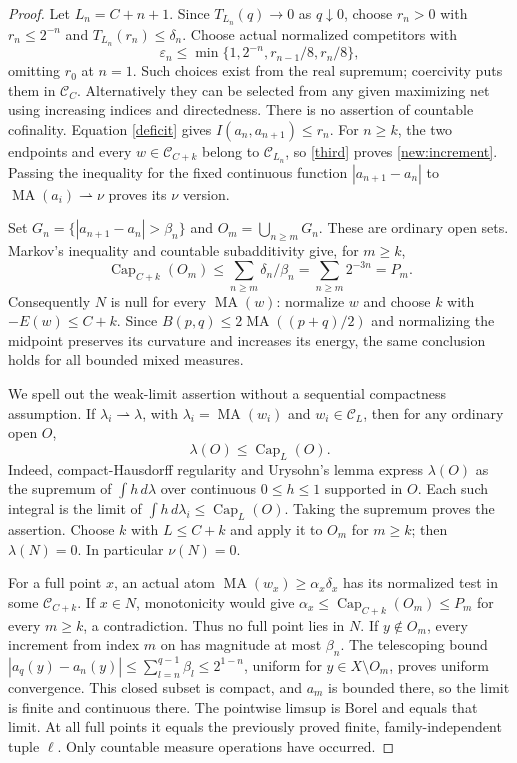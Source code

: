 \documentclass[11pt]{article}
\newcommand{\MA}{\operatorname{MA}}
\newcommand{\C}{\mathcal C}
\begin{document}
\begin{proof}
Let $L_n=C+n+1$. Since $T_{L_n}(q)\to0$ as $q\downarrow0$, choose
$r_n>0$ with $r_n\le2^{-n}$ and $T_{L_n}(r_n)\le\delta_n$.
Choose actual normalized competitors with
\[
 \varepsilon_n\le\min\{1,2^{-n},r_{n-1}/8,r_n/8\},
\]
omitting $r_0$ at $n=1$. Such choices exist from the real supremum;
coercivity puts them in $\C_C$. Alternatively they can be selected
from any given maximizing net using increasing indices and directedness.
There is no assertion of countable cofinality. Equation \eqref{deficit}
gives $I(a_n,a_{n+1})\le r_n$. For $n\ge k$, the two endpoints and
every $w\in\C_{C+k}$ belong to $\C_{L_n}$, so \eqref{third} proves
\eqref{new:increment}. Passing the inequality for the fixed continuous
function $|a_{n+1}-a_n|$ to $\MA(a_i)\rightharpoonup\nu$ proves its
$\nu$ version.

Set $G_n=\{|a_{n+1}-a_n|>\beta_n\}$ and
$O_m=\bigcup_{n\ge m}G_n$. These are ordinary open sets. Markov's
inequality and countable subadditivity give, for $m\ge k$,
\[
 \operatorname{Cap}_{C+k}(O_m)
 \le\sum_{n\ge m}\delta_n/\beta_n
 =\sum_{n\ge m}2^{-3n}=P_m.
\]
Consequently $N$ is null for every $\MA(w)$: normalize $w$ and choose
$k$ with $-E(w)\le C+k$. Since
$B(p,q)\le2\MA((p+q)/2)$ and normalizing the midpoint preserves its
curvature and increases its energy, the same conclusion holds for
all bounded mixed measures.

We spell out the weak-limit assertion without a sequential compactness
assumption. If $\lambda_i\rightharpoonup\lambda$, with
$\lambda_i=\MA(w_i)$ and $w_i\in\C_L$, then for any ordinary open
$O$,
\[
 \lambda(O)\le\operatorname{Cap}_L(O).
\]
Indeed, compact-Hausdorff regularity and Urysohn's lemma express
$\lambda(O)$ as the supremum of $\int h\,d\lambda$ over continuous
$0\le h\le1$ supported in $O$. Each such integral is the limit of
$\int h\,d\lambda_i\le\operatorname{Cap}_L(O)$. Taking the supremum
proves the assertion. Choose $k$ with $L\le C+k$ and apply it to
$O_m$ for $m\ge k$; then $\lambda(N)=0$. In particular $\nu(N)=0$.

For a full point $x$, an actual atom
$\MA(w_x)\ge\alpha_x\delta_x$ has its normalized test in some
$\C_{C+k}$. If $x\in N$, monotonicity would give
$\alpha_x\le\operatorname{Cap}_{C+k}(O_m)\le P_m$ for every
$m\ge k$, a contradiction. Thus no full point lies in $N$.
If $y\notin O_m$, every increment from index $m$ on has magnitude
at most $\beta_n$. The telescoping bound
$|a_q(y)-a_n(y)|\le\sum_{l=n}^{q-1}\beta_l\le2^{1-n}$,
uniform for $y\in X\setminus O_m$, proves uniform convergence.
This closed subset is compact, and $a_m$ is bounded there, so the limit
is finite and continuous there. The pointwise limsup is Borel and
equals that limit. At all full points it equals the previously proved
finite, family-independent tuple $\ell$. Only countable measure
operations have occurred.
\end{proof}
\end{document}
